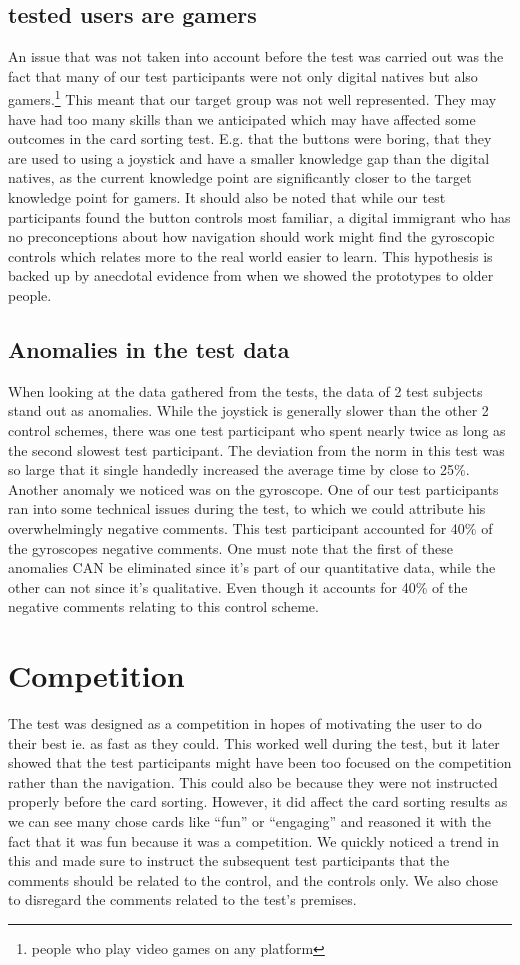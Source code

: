 \subsection*{tested users are gamers} \label{TestedUsersAreGamers}
An issue that was not taken into account before the test was carried out was the fact that many of our test participants were not only digital natives but also gamers.\footnote{people  who play video games on any platform} This meant that our target group was not well represented. They may have had too many skills than we anticipated which may have affected some outcomes in the card sorting test. E.g. that the buttons were boring, that they are used to using a joystick and have a smaller knowledge gap than the digital natives, as the current knowledge point are significantly closer to the target knowledge point for gamers. 
It should also be noted that while our test participants found the button controls most familiar, a digital immigrant who has no preconceptions about how navigation should work might find the gyroscopic controls which relates more to the real world easier to learn. This hypothesis is backed up by anecdotal evidence from when we showed the prototypes to older people. 
\subsection*{Anomalies in the test data}
When looking at the data gathered from the tests, the data of 2 test subjects stand out as anomalies. While the joystick is generally slower than the other 2 control schemes, there was one test participant who spent nearly twice as long as the second slowest test participant.
The deviation from the norm in this test was so large that it single handedly increased the average time by close to 25\%.
Another anomaly we noticed was on the gyroscope. One of our test participants ran into some technical issues during the test, to which we could attribute his overwhelmingly negative comments. This test participant accounted for 40\% of the gyroscopes negative comments.
One must note that the first of these anomalies CAN be eliminated since it’s part of our quantitative data, while the other can not since it’s qualitative. Even though it accounts for 40\% of the negative comments relating to this control scheme.

\section*{Competition}
The test was designed as a competition in hopes of motivating the user to do their best ie. as fast as they could. This worked well during the test, but it later showed that the test participants might have been too focused on the competition rather than the navigation. This could also be because they were not instructed properly before the card sorting. However, it did affect the card sorting results as we can see many chose cards like “fun” or “engaging” and reasoned it with the fact that it was fun because it was a competition. 
We quickly noticed a trend in this and made sure to instruct the subsequent test participants that the comments should be related to the control, and the controls only.
We also chose to disregard the comments related to the test’s premises.


